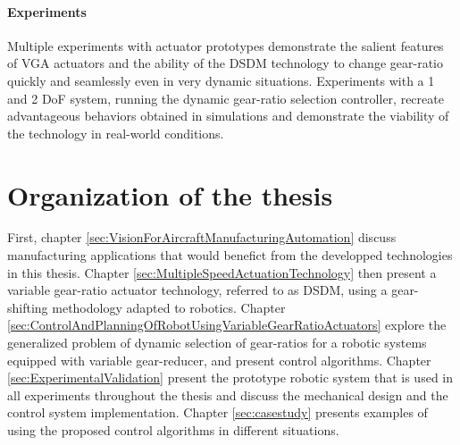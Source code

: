 \paragraph{Experiments}
%
Multiple experiments with actuator prototypes demonstrate the salient features of VGA actuators and the ability of the DSDM technology to change gear-ratio quickly and seamlessly even in very dynamic situations. Experiments with a 1 and 2 DoF system, running the dynamic gear-ratio selection controller, recreate advantageous behaviors obtained in simulations and demonstrate the viability of the technology in real-world conditions.


\section{Organization of the thesis}
\label{sec:OrganisationOfTheThesis}

First, chapter \ref{sec:VisionForAircraftManufacturingAutomation} discuss manufacturing applications that would benefict from the developped technologies in this thesis. Chapter \ref{sec:MultipleSpeedActuationTechnology} then present a variable gear-ratio actuator technology, referred to as DSDM, using a gear-shifting methodology adapted to robotics. Chapter \ref{sec:ControlAndPlanningOfRobotUsingVariableGearRatioActuators} explore the generalized problem of dynamic selection of gear-ratios for a robotic systems equipped with variable gear-reducer, and present control algorithms. Chapter \ref{sec:ExperimentalValidation} present the prototype robotic system that is used in all experiments throughout the thesis and discuss the mechanical design and the control system implementation. Chapter \ref{sec:casestudy} presents examples of using the proposed control algorithms in different situations.


